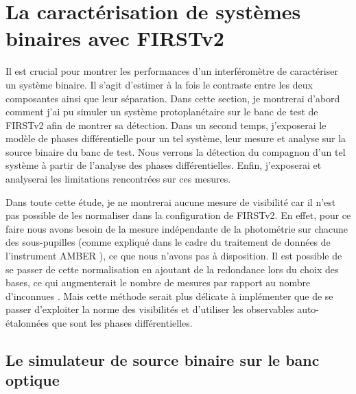 \clearpage
\section{La caractérisation de systèmes binaires avec FIRSTv2}
\label{sec:BinaryCharac}
\setcounter{figure}{0}
\setcounter{table}{0}

Il est crucial pour montrer les performances d'un interféromètre de caractériser un système binaire. Il s'agit d'estimer à la fois le contraste entre les deux composantes ainsi que leur séparation. Dans cette section, je montrerai d'abord comment j'ai pu simuler un système protoplanétaire sur le banc de test de \ac{FIRSTv2} afin de montrer sa détection. Dans un second temps, j'exposerai le modèle de phases différentielle pour un tel système, leur mesure et analyse sur la source binaire du banc de test. Nous verrons la détection du compagnon d'un tel système à partir de l'analyse des phases différentielles. Enfin, j'exposerai et analyserai les limitations rencontrées sur ces mesures.

Dans toute cette étude, je ne montrerai aucune mesure de visibilité car il n'est pas possible de les normaliser dans la configuration de \ac{FIRSTv2}. En effet, pour ce faire nous avons besoin de la mesure indépendante de la photométrie sur chacune des sous-pupilles (comme expliqué dans le cadre du traitement de données de l'instrument \ac{AMBER} \citep{tatulli2007}), ce que nous n'avons pas à disposition. Il est possible de se passer de cette normalisation en ajoutant de la redondance lors du choix des bases, ce qui augmenterait le nombre de mesures par rapport au nombre d'inconnues \citep{lacour2007}. Mais cette méthode serait plus délicate à implémenter que de se passer d'exploiter la norme des visibilités et d'utiliser les observables auto-étalonnées que sont les phases différentielles.



\subsection{Le simulateur de source binaire sur le banc optique}
\label{sec:SystBinaire}

